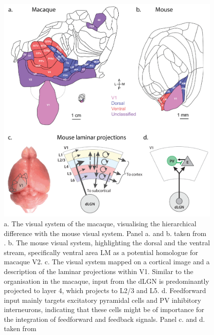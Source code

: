 \documentclass[12pt]{article}
\begin{document}
\begin{figure}[H]
  \centering
  \includegraphics[width=1.0 \textwidth]{adjusted_figures/Laminar_Figure.png}
  \caption{a. The visual system of the macaque, visualising the hierarchical difference with the mouse visual system. Panel a. and b. taken from \textcite{gamanutAnatomicalFunctionalConnectomes2022}. b. The mouse visual system, highlighting the dorsal and the ventral stream, specifically ventral area LM as a potential homologue for macaque V2. c. The visual system mapped on a cortical image and a description of the laminar projections within V1. Similar to the organisation in the macaque, input from the dLGN is predominantly projected to layer 4, which projects to L2/3 and L5. d. Feedforward input mainly targets excitatory pyramidal cells and PV inhibitory interneurons, indicating that these cells might be of importance for the integration of feedforward and feedback signals. Panel c. and d. taken from \textcite{niellHowCorticalCircuits2021}}
  \label{fig:Laminar_Figure}
\end{figure}



\end{document}

